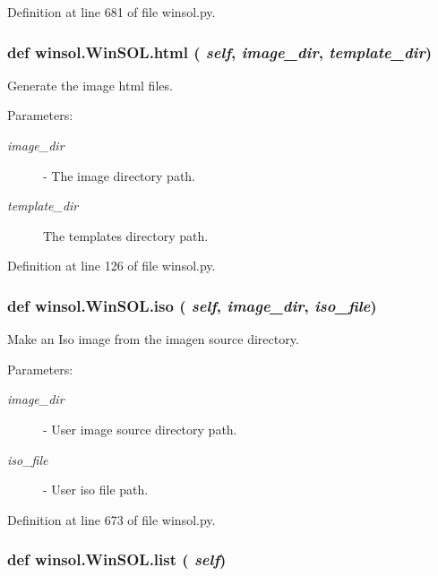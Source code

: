 Definition at line 681 of file winsol.py.\hypertarget{classwinsol_1_1WinSOL_cfede741c471ea4d2ec9e0b823b4a23b}{
\subsubsection[html]{\setlength{\rightskip}{0pt plus 5cm}def winsol.Win\-SOL.html ( {\em self},  {\em image\_\-dir},  {\em template\_\-dir})}}
\label{classwinsol_1_1WinSOL_cfede741c471ea4d2ec9e0b823b4a23b}


Generate the image html files. 

\begin{Desc}
\item[Parameters:]
\begin{description}
\item[{\em image\_\-dir}]- The image directory path. \item[{\em template\_\-dir}]The templates directory path. \end{description}
\end{Desc}


Definition at line 126 of file winsol.py.\hypertarget{classwinsol_1_1WinSOL_7c66ff1af7209463859a779e0d21e898}{
\subsubsection[iso]{\setlength{\rightskip}{0pt plus 5cm}def winsol.Win\-SOL.iso ( {\em self},  {\em image\_\-dir},  {\em iso\_\-file})}}
\label{classwinsol_1_1WinSOL_7c66ff1af7209463859a779e0d21e898}


Make an Iso image from the imagen source directory. 

\begin{Desc}
\item[Parameters:]
\begin{description}
\item[{\em image\_\-dir}]- User image source directory path. \item[{\em iso\_\-file}]- User iso file path. \end{description}
\end{Desc}


Definition at line 673 of file winsol.py.\hypertarget{classwinsol_1_1WinSOL_59c95792ce840bd4165507a3c4706e7e}{
\subsubsection[list]{\setlength{\rightskip}{0pt plus 5cm}def winsol.Win\-SOL.list ( {\em self})}}
\label{classwinsol_1_1WinSOL_59c95792ce840bd4165507a3c4706e7e}


